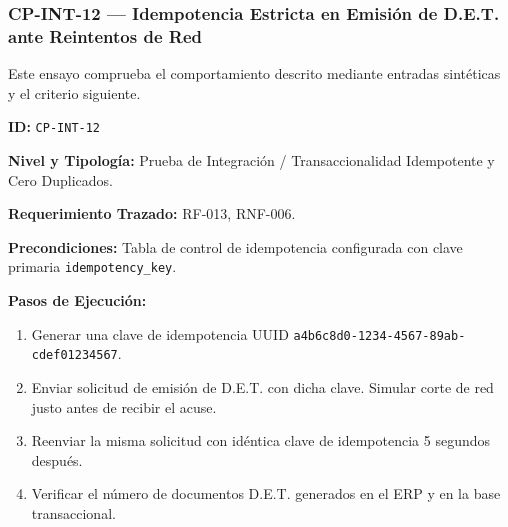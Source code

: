 \subsubsection*{CP-INT-12 — Idempotencia Estricta en Emisión de D.E.T. ante Reintentos de Red}\label{sec:9-cp-int-12}
Este ensayo comprueba el comportamiento descrito mediante entradas sintéticas y el criterio siguiente.

\par\noindent\textbf{ID:} \texttt{C\allowbreak{}P\allowbreak{}-\allowbreak{}I\allowbreak{}N\allowbreak{}T\allowbreak{}-\allowbreak{}1\allowbreak{}2\allowbreak{}}\par
\par\noindent\textbf{Nivel y Tipología:} Prueba de Integración / Transaccionalidad Idempotente y Cero Duplicados.\par
\par\noindent\textbf{Requerimiento Trazado:} RF-013, RNF-006.\par
\par\noindent\textbf{Precondiciones:} Tabla de control de idempotencia configurada con clave primaria \texttt{i\allowbreak{}d\allowbreak{}e\allowbreak{}m\allowbreak{}p\allowbreak{}o\allowbreak{}t\allowbreak{}e\allowbreak{}n\allowbreak{}c\allowbreak{}y\allowbreak{}\_\allowbreak{}k\allowbreak{}e\allowbreak{}y\allowbreak{}}.\par
\par\noindent\textbf{Pasos de Ejecución:} \par
\begin{enumerate}
\item Generar una clave de idempotencia UUID \texttt{a\allowbreak{}4\allowbreak{}b\allowbreak{}6\allowbreak{}c\allowbreak{}8\allowbreak{}d\allowbreak{}0\allowbreak{}-\allowbreak{}1\allowbreak{}2\allowbreak{}3\allowbreak{}4\allowbreak{}-\allowbreak{}4\allowbreak{}5\allowbreak{}6\allowbreak{}7\allowbreak{}-\allowbreak{}8\allowbreak{}9\allowbreak{}a\allowbreak{}b\allowbreak{}-\allowbreak{}c\allowbreak{}d\allowbreak{}e\allowbreak{}f\allowbreak{}0\allowbreak{}1\allowbreak{}2\allowbreak{}3\allowbreak{}4\allowbreak{}5\allowbreak{}6\allowbreak{}7\allowbreak{}}.
\item Enviar solicitud de emisión de D.E.T. con dicha clave. Simular corte de red justo antes de recibir el acuse.
\item Reenviar la misma solicitud con idéntica clave de idempotencia 5 segundos después.
\item Verificar el número de documentos D.E.T. generados en el ERP y en la base transaccional.
\end{enumerate}
